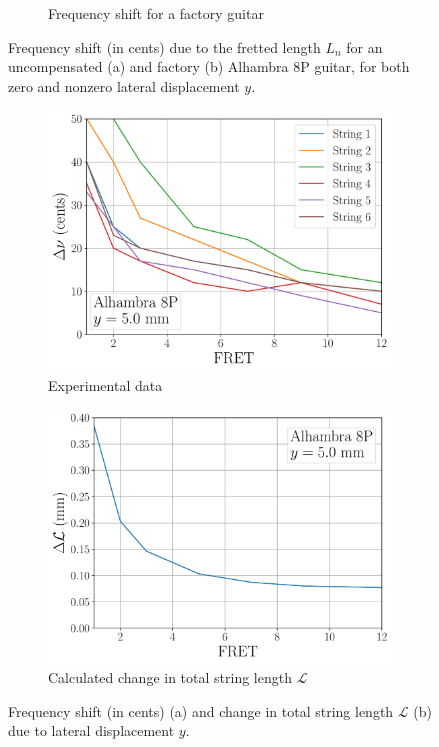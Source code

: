 \begin{figure}
\begin{subfigure}[b]{0.8\textwidth}
   \caption{Frequency shift for a factory guitar}
   \label{fig:norm_error_factory}
  \end{subfigure}
  \caption{\label{fig:norm_error} Frequency shift (in cents) due to the fretted length $L_n$ for an uncompensated (a) and factory (b) Alhambra 8P guitar, for both zero and nonzero lateral displacement $y$.}
 \end{figure}

 \begin{figure}
  \centering
  \begin{subfigure}[b]{0.8\textwidth}
   \centering
   \includegraphics[width=5.0in]{figures/shift_data}
   \caption{Experimental data}
   \label{fig:shift_data}
  \end{subfigure}
  \par\vspace{0.25in}
  \begin{subfigure}[b]{0.8\textwidth}
   \centering
   \includegraphics[width=5.0in]{figures/delta_l}
   \caption{Calculated change in total string length $\mathcal{L}$}
   \label{fig:delta_l}
  \end{subfigure}
  \caption{\label{fig:exp_data} Frequency shift (in cents) (a) and change in total string length $\mathcal{L}$ (b) due to lateral displacement $y$.}
 \end{figure}
